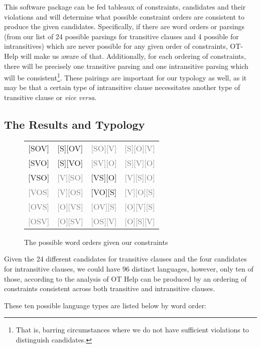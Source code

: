 \documentclass{article}
\begin{document}
This software package can be fed tableaux of constraints, candidates and their violations and will determine what possible constraint orders are consistent to produce the given candidates.
Specifically, if there are word orders or parsings (from our list of 24 possible parsings for transitive clauses and 4 possible for intransitives) which are never possible for any given order of constraints, OT-Help will make us aware of that.
Additionally, for each ordering of constraints, there will be precisely one transitive parsing and one intransitive parsing which will be consistent\footnote{That is, barring circumstances where we do not have sufficient violations to distinguish candidates.}.
These pairings are important for our typology as well, as it may be that a certain type of intransitive clause necessitates another type of transitive clause or \textit{vice versa}.

\subsection{The Results and Typology}

\newcommand{\no}{\textcolor{gray}}

\begin{figure}
	\begin{center}
	\begin{tabular}{cccc}
		{}[SOV]&[S][OV]&\no{[SO][V]}&\no{[S][O][V]}\\
		{}[SVO]&[S][VO]&\no{[SV][O]}&\no{[S][V][O]}\\
		{}[VSO]&\no{[V][SO]}&[VS][O]&\no{[V][S][O]}\\
		{}\no{[VOS]}&\no{[V][OS]}&[VO][S]&\no{[V][O][S]}\\
		{}\no{[OVS]}&\no{[O][VS]}&\no{[OV][S]}&\no{[O][V][S]}\\
		{}\no{[OSV]}&\no{[O][SV]}&\no{[OS][V]}&\no{[O][S][V]}\\
	\end{tabular}
	\end{center}
	\caption{The possible word orders given our constraints}
\end{figure}

Given the 24 different candidates for transitive clauses and the four candidates for intransitive clauses, we could have 96 distinct languages, however, only ten of those, according to the analysis of OT Help can be produced by an ordering of constraints consistent across both transitive and intransitive clauses.

These ten possible language types are listed below by word order:
\end{document}
